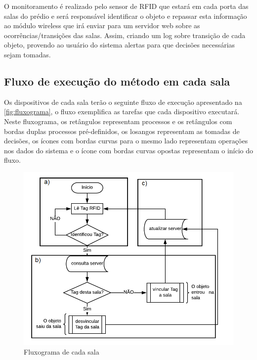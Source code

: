 O monitoramento é realizado pelo sensor de RFID que estará em cada porta das salas do prédio e será responsável
identificar o objeto e repassar esta informação ao módulo wireless que irá enviar para um servidor web sobre as
ocorrências/transições das salas. Assim, criando um log sobre transição de cada objeto, provendo ao usuário do sistema
alertas para que decisões necessárias sejam tomadas.



\subsection{Fluxo de execução do método em cada sala}
Os dispositivos de cada sala terão o seguinte fluxo de execução apresentado na \autoref{fig:fluxograma},
o fluxo exemplifica as tarefas que cada dispositivo executará. Neste fluxograma, os retângulos representam
processos e os retângulos com bordas duplas processos pré-definidos, os losangos representam as tomadas de decisões,
os ícones com bordas curvas para o mesmo lado representam operações nos dados do sistema e o ícone com bordas curvas
opostas representam o início do fluxo.

\begin{figure}[H]
              \caption{\label{fig:fluxograma}{Fluxograma de cada sala}}
              \centering
              \includegraphics[width=1\textwidth]{Figuras/fluxograma.png}
\end{figure}

